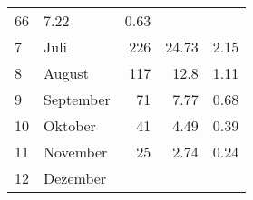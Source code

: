 \begin{longtable}{lXrrr}
       \num{66} &
       \num[round-mode=places,round-precision=2]{7.22} &
         \num[round-mode=places,round-precision=2]{0.63} \\

     7 &
     \multicolumn{1}{X}{ Juli   } &


       \num{226} &
       \num[round-mode=places,round-precision=2]{24.73} &
         \num[round-mode=places,round-precision=2]{2.15} \\

     8 &
     \multicolumn{1}{X}{ August   } &


       \num{117} &
       \num[round-mode=places,round-precision=2]{12.8} &
         \num[round-mode=places,round-precision=2]{1.11} \\

     9 &
     \multicolumn{1}{X}{ September   } &


       \num{71} &
       \num[round-mode=places,round-precision=2]{7.77} &
         \num[round-mode=places,round-precision=2]{0.68} \\

     10 &
     \multicolumn{1}{X}{ Oktober   } &


       \num{41} &
       \num[round-mode=places,round-precision=2]{4.49} &
         \num[round-mode=places,round-precision=2]{0.39} \\

     11 &
     \multicolumn{1}{X}{ November   } &


       \num{25} &
       \num[round-mode=places,round-precision=2]{2.74} &
         \num[round-mode=places,round-precision=2]{0.24} \\

     12 &
     \multicolumn{1}{X}{ Dezember   } &



\end{longtable}
